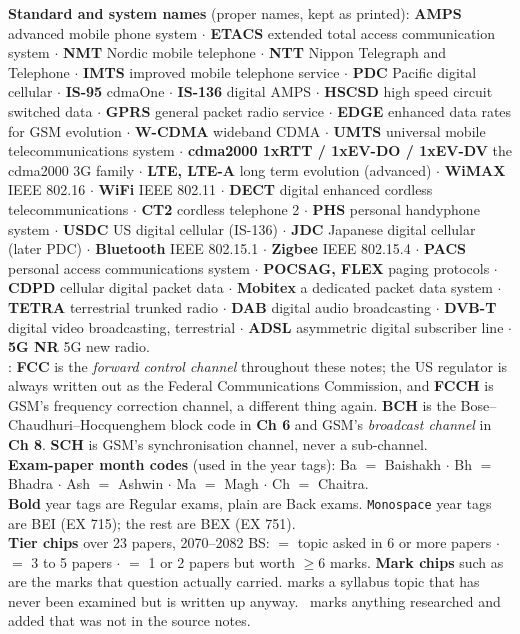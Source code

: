 \vspace{3pt}
{\color{sub}\footnotesize
\textbf{Standard and system names} (proper names, kept as printed):
\textbf{AMPS} advanced mobile phone system $\cdot$
\textbf{ETACS} extended total access communication system $\cdot$
\textbf{NMT} Nordic mobile telephone $\cdot$
\textbf{NTT} Nippon Telegraph and Telephone $\cdot$
\textbf{IMTS} improved mobile telephone service $\cdot$
\textbf{PDC} Pacific digital cellular $\cdot$
\textbf{IS-95} cdmaOne $\cdot$ \textbf{IS-136} digital AMPS $\cdot$
\textbf{HSCSD} high speed circuit switched data $\cdot$
\textbf{GPRS} general packet radio service $\cdot$
\textbf{EDGE} enhanced data rates for GSM evolution $\cdot$
\textbf{W-CDMA} wideband CDMA $\cdot$
\textbf{UMTS} universal mobile telecommunications system $\cdot$
\textbf{cdma2000 1xRTT / 1xEV-DO / 1xEV-DV} the cdma2000 3G family $\cdot$
\textbf{LTE, LTE-A} long term evolution (advanced) $\cdot$
\textbf{WiMAX} IEEE 802.16 $\cdot$ \textbf{WiFi} IEEE 802.11 $\cdot$
\textbf{DECT} digital enhanced cordless telecommunications $\cdot$
\textbf{CT2} cordless telephone 2 $\cdot$ \textbf{PHS} personal handyphone system $\cdot$
\textbf{USDC} US digital cellular (IS-136) $\cdot$
\textbf{JDC} Japanese digital cellular (later PDC) $\cdot$
\textbf{Bluetooth} IEEE 802.15.1 $\cdot$ \textbf{Zigbee} IEEE 802.15.4 $\cdot$
\textbf{PACS} personal access communications system $\cdot$
\textbf{POCSAG, FLEX} paging protocols $\cdot$
\textbf{CDPD} cellular digital packet data $\cdot$
\textbf{Mobitex} a dedicated packet data system $\cdot$
\textbf{TETRA} terrestrial trunked radio $\cdot$
\textbf{DAB} digital audio broadcasting $\cdot$
\textbf{DVB-T} digital video broadcasting, terrestrial $\cdot$
\textbf{ADSL} asymmetric digital subscriber line $\cdot$
\textbf{5G NR} 5G new radio. \\
:
\textbf{FCC} is the \emph{forward control channel} throughout these notes; the US regulator is
always written out as the Federal Communications Commission, and \textbf{FCCH} is GSM's
frequency correction channel, a different thing again. \textbf{BCH} is the
Bose--Chaudhuri--Hocquenghem block code in \textbf{Ch 6} and GSM's \emph{broadcast channel} in
\textbf{Ch 8}. \textbf{SCH} is GSM's synchronisation channel, never a sub-channel. \\
\textbf{Exam-paper month codes} (used in the year tags):
Ba $=$ Baishakh $\cdot$ Bh $=$ Bhadra $\cdot$ Ash $=$ Ashwin $\cdot$
Ma $=$ Magh $\cdot$ Ch $=$ Chaitra. \\
\textbf{Bold} year tags are Regular exams, plain are Back exams.
\texttt{Monospace} year tags are BEI (EX 715); the rest are BEX (EX 751). \\
\textbf{Tier chips} over 23 papers, 2070--2082 BS:
\tS{} $=$ topic asked in 6 or more papers $\cdot$
\tF{} $=$ 3 to 5 papers $\cdot$
\tP{} $=$ 1 or 2 papers but worth $\ge$6 marks.
\textbf{Mark chips} such as  are the marks that question actually carried.
 marks a syllabus topic that has never been examined but is
written up anyway. \added\ marks anything researched and added that was not in the source notes.}
